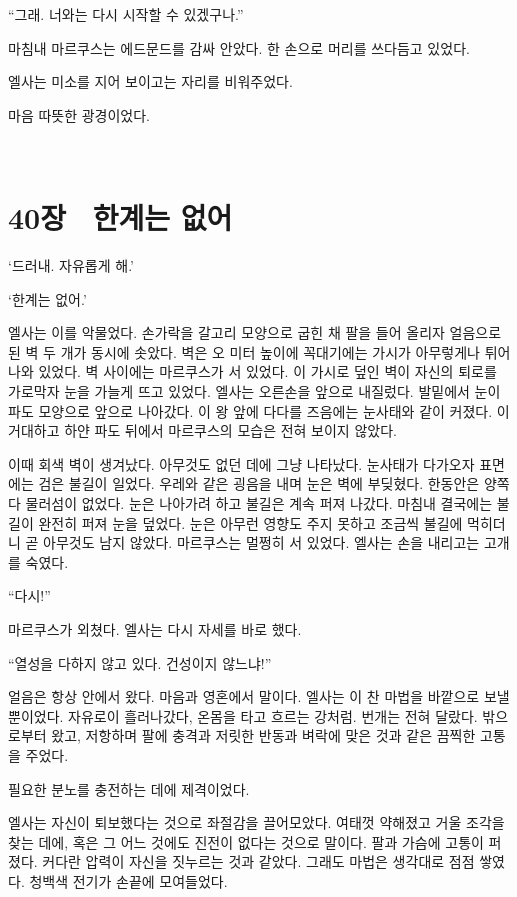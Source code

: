 ``그래. 너와는 다시 시작할 수 있겠구나.''

마침내 마르쿠스는 에드문드를 감싸 안았다. 한 손으로 머리를 쓰다듬고 있었다.

엘사는 미소를 지어 보이고는 자리를 비워주었다.

마음 따뜻한 광경이었다.

﻿

\chapter[40장  한계는 없어][40장\hspace*{.5em}한계는 없어]{40장 \ 한계는 없어}



\forceindent`드러내. 자유롭게 해.'

`한계는 없어.'

엘사는 이를 악물었다. 손가락을 갈고리 모양으로 굽힌 채 팔을 들어 올리자 얼음으로 된 벽 두 개가 동시에 솟았다. 벽은 오 미터 높이에 꼭대기에는 가시가 아무렇게나 튀어나와 있었다. 벽 사이에는 마르쿠스가 서 있었다. 이 가시로 덮인 벽이 자신의 퇴로를 가로막자 눈을 가늘게 뜨고 있었다. 엘사는 오른손을 앞으로 내질렀다. 발밑에서 눈이 파도 모양으로 앞으로 나아갔다. 이 왕 앞에 다다를 즈음에는 눈사태와 같이 커졌다. 이 거대하고 하얀 파도 뒤에서 마르쿠스의 모습은 전혀 보이지 않았다.

이때 회색 벽이 생겨났다. 아무것도 없던 데에 그냥 나타났다. 눈사태가 다가오자 표면에는 검은 불길이 일었다. 우레와 같은 굉음을 내며 눈은 벽에 부딪혔다. 한동안은 양쪽 다 물러섬이 없었다. 눈은 나아가려 하고 불길은 계속 퍼져 나갔다. 마침내 결국에는 불길이 완전히 퍼져 눈을 덮었다. 눈은 아무런 영향도 주지 못하고 조금씩 불길에 먹히더니 곧 아무것도 남지 않았다. 마르쿠스는 멀쩡히 서 있었다. 엘사는 손을 내리고는 고개를 숙였다.

``다시!''

마르쿠스가 외쳤다. 엘사는 다시 자세를 바로 했다.

``열성을 다하지 않고 있다. 건성이지 않느냐!''

얼음은 항상 안에서 왔다. 마음과 영혼에서 말이다. 엘사는 이 찬 마법을 바깥으로 보낼 뿐이었다. 자유로이 흘러나갔다, 온몸을 타고 흐르는 강처럼. 번개는 전혀 달랐다. 밖으로부터 왔고, 저항하며 팔에 충격과 저릿한 반동과 벼락에 맞은 것과 같은 끔찍한 고통을 주었다.

필요한 분노를 충전하는 데에 제격이었다.

엘사는 자신이 퇴보했다는 것으로 좌절감을 끌어모았다. 여태껏 약해졌고 거울 조각을 찾는 데에, 혹은 그 어느 것에도 진전이 없다는 것으로 말이다. 팔과 가슴에 고통이 퍼졌다. 커다란 압력이 자신을 짓누르는 것과 같았다. 그래도 마법은 생각대로 점점 쌓였다. 청백색 전기가 손끝에 모여들었다.

